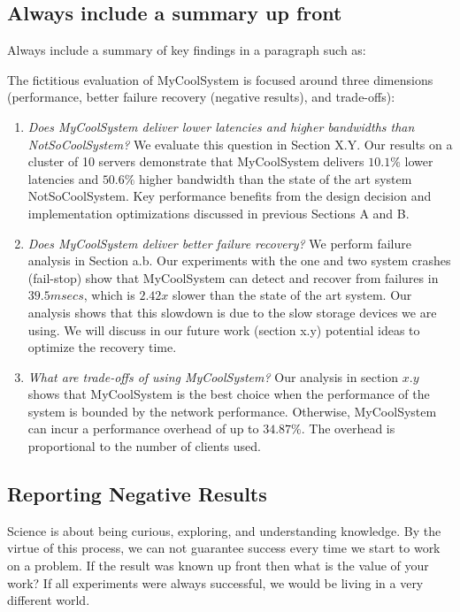 \documentclass{article}
\begin{document}
\subsection*{Always include a summary up front}
Always include a summary of key findings in a paragraph such as: 
\begin{tcolorbox}[colback=green!5,colframe=gray!40!black,title=Example of Evaluation Summary]
The fictitious evaluation of MyCoolSystem is focused around three dimensions (performance, better failure recovery (negative results), and trade-offs): 
\begin{enumerate}
    \item \textit{Does MyCoolSystem deliver lower latencies and higher bandwidths than NotSoCoolSystem?} We evaluate this question in Section X.Y. Our results on a cluster of 10 servers demonstrate that MyCoolSystem delivers $10.1\%$ lower latencies and $50.6\%$ higher bandwidth than the state of the art system NotSoCoolSystem. Key performance benefits from the design decision and implementation optimizations discussed in previous Sections A and B. 
    
    \item \textit{Does MyCoolSystem deliver better failure recovery?} We perform failure analysis in Section a.b. Our experiments with the one and two system crashes (fail-stop) show that MyCoolSystem can detect and recover from failures in $39.5msecs$, which is $2.42x$ slower than the state of the art system. Our analysis shows that this slowdown is due to the slow storage devices we are using. We will discuss in our future work (section x.y) potential ideas to optimize the recovery time. 
    
    \item \textit{What are trade-offs of using MyCoolSystem?} Our analysis in section $x.y$ shows that MyCoolSystem is the best choice when the performance of the system is bounded by the  network performance. Otherwise, MyCoolSystem can incur a performance overhead of up to $34.87\%$. The overhead is proportional to the number of clients used. 
\end{enumerate}
\end{tcolorbox}

\subsection{Reporting Negative Results}
Science is about being curious, exploring, and understanding knowledge. By the virtue of this process, we can not guarantee success every time we start to work on a problem. If the result was known up front then what is the value of your work? If all experiments were always successful, we would be living in a very different world. 
\end{document}

